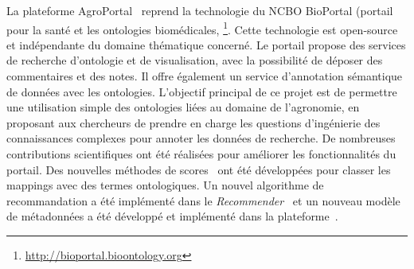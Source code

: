 La plateforme AgroPortal~\cite{Jonquet2016,Jonquet2018} reprend la technologie du NCBO BioPortal (portail pour la santé et les ontologies biomédicales, \footnote{\url{http://bioportal.bioontology.org}}. Cette technologie est open-source et indépendante du domaine thématique concerné. Le portail propose des services de recherche d'ontologie et de visualisation, avec la possibilité de déposer des commentaires et des notes. Il offre également un service d'annotation sémantique de données avec les ontologies. L'objectif principal de ce projet est de permettre une utilisation simple des ontologies liées au domaine de l'agronomie, en proposant aux chercheurs de prendre en charge les questions d'ingénierie des connaissances complexes pour annoter les données de recherche. De nombreuses contributions scientifiques ont été réalisées pour améliorer les fonctionnalités du portail. Des nouvelles méthodes de scores~\cite{Melzi} ont été développées pour classer les mappings avec des termes ontologiques. Un nouvel algorithme de recommandation a été implémenté dans le \textit{Recommender}~\cite{RomeroJOGPM16} et un nouveau modèle de métadonnées a été développé et implémenté dans la plateforme~\cite{toulet:lirmm-01397388}.\\

